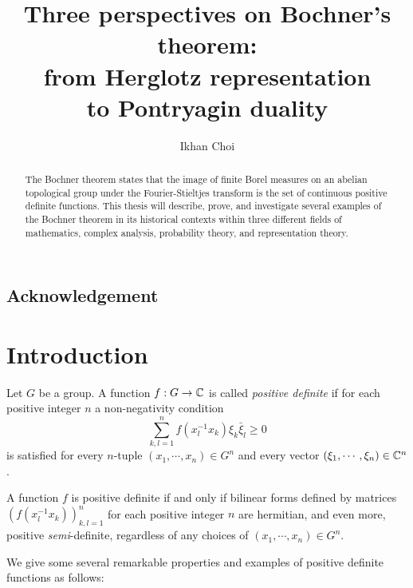 \documentclass[12pt]{article}
\title{Three perspectives on Bochner's theorem:\\from Herglotz representation\\to Pontryagin duality}
\author{Ikhan Choi}
\begin{document}
\maketitle
\begin{abstract}
The Bochner theorem states that the image of finite Borel measures on an abelian topological group under the Fourier-Stieltjes transform is the set of continuous positive definite functions.
This thesis will describe, prove, and investigate several examples of the Bochner theorem in its historical contexts within three different fields of mathematics, complex analysis, probability theory, and representation theory.
\end{abstract}
\newpage
\tableofcontents

\subsection*{Acknowledgement}








%


\newpage
\section{Introduction}


\begin{defn}
Let $G$ be a group.
A function $f:G\to\mathbb{C}$ is called \emph{positive definite} if for each positive integer $n$ a non-negativity condition
\[\sum_{k,l=1}^nf(x_l^{-1}x_k)\xi_k\bar\xi_l\ge0\]
is satisfied for every $n$-tuple $(x_1,\cdots,x_n)\in G^n$ and every vector $(\xi_1,\cdots,\xi_n)\in\mathbb{C}^n$.
\end{defn}
A function $f$ is positive definite if and only if bilinear forms defined by matrices $(f(x_l^{-1}x_k))_{k,l=1}^n$ for each positive integer $n$ are hermitian, and even more, positive \emph{semi}-definite, regardless of any choices of $(x_1,\cdots,x_n)\in G^n$.

We give some several remarkable properties and examples of positive definite functions as follows:
\end{document}
